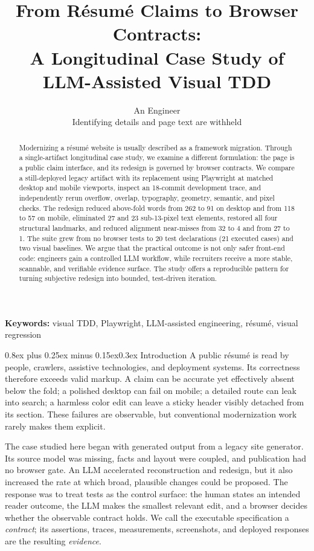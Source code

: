 \documentclass[9pt,twocolumn]{extarticle}
\title{\vspace{-1.55em}\textbf{From R\'esum\'e Claims to Browser Contracts:}\\[-0.1em]
\large A Longitudinal Case Study of LLM-Assisted Visual TDD}
\author{An Engineer\\[-0.2em]
\small Identifying details and page text are withheld}
\date{}
\makeatletter
\renewcommand{\section}{\@startsection{section}{1}{0pt}%
  {0.8ex plus 0.25ex minus 0.15ex}{0.3ex}%
  {\normalfont\large\bfseries\color{accent}}}
\makeatother
\begin{document}
\maketitle
\vspace{-1.55em}

\begin{abstract}
Modernizing a r\'esum\'e website is usually described as a framework migration. Through a single-artifact longitudinal case study, we examine a different formulation: the page is a public claim interface, and its redesign is governed by browser contracts. We compare a still-deployed legacy artifact with its replacement using Playwright at matched desktop and mobile viewports, inspect an 18-commit development trace, and independently rerun overflow, overlap, typography, geometry, semantic, and pixel checks. The redesign reduced above-fold words from 262 to 91 on desktop and from 118 to 57 on mobile, eliminated 27 and 23 sub-13-pixel text elements, restored all four structural landmarks, and reduced alignment near-misses from 32 to 4 and from 27 to 1. The suite grew from no browser tests to 20 test declarations (21 executed cases) and two visual baselines. We argue that the practical outcome is not only safer front-end code: engineers gain a controlled LLM workflow, while recruiters receive a more stable, scannable, and verifiable evidence surface. The study offers a reproducible pattern for turning subjective redesign into bounded, test-driven iteration.
\end{abstract}

\textbf{Keywords:} visual TDD, Playwright, LLM-assisted engineering, r\'esum\'e, visual regression

\section{Introduction}
A public r\'esum\'e is read by people, crawlers, assistive technologies, and deployment systems. Its correctness therefore exceeds valid markup. A claim can be accurate yet effectively absent below the fold; a polished desktop can fail on mobile; a detailed route can leak into search; a harmless color edit can leave a sticky header visibly detached from its section. These failures are observable, but conventional modernization work rarely makes them explicit.

The case studied here began with generated output from a legacy site generator. Its source model was missing, facts and layout were coupled, and publication had no browser gate. An LLM accelerated reconstruction and redesign, but it also increased the rate at which broad, plausible changes could be proposed. The response was to treat tests as the control surface: the human states an intended reader outcome, the LLM makes the smallest relevant edit, and a browser decides whether the observable contract holds. We call the executable specification a \emph{contract}; its assertions, traces, measurements, screenshots, and deployed responses are the resulting \emph{evidence}.
\end{document}
